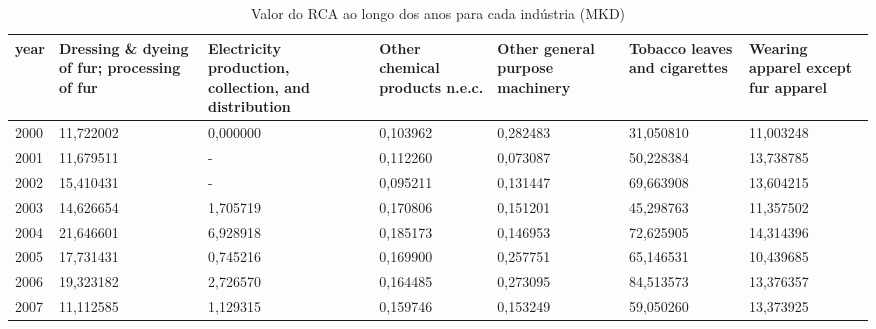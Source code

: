 \begin{table}
\centering
\caption{Valor do RCA ao longo dos anos para cada indústria (MKD)}
\begin{tabular}{p{1cm}p{2cm}p{2cm}p{2cm}p{2cm}p{2cm}p{2cm}}
\toprule
 year &  Dressing \& dyeing of fur; processing of fur &  Electricity production, collection, and distribution &  Other chemical products n.e.c. &  Other general purpose machinery &  Tobacco leaves and cigarettes &  Wearing apparel except fur apparel \\
\midrule
 2000 &                                    11,722002 &                                           0,000000 &                        0,103962 &                         0,282483 &                      31,050810 &                           11,003248 \\
 2001 &                                    11,679511 &                                                  - &                        0,112260 &                         0,073087 &                      50,228384 &                           13,738785 \\
 2002 &                                    15,410431 &                                                  - &                        0,095211 &                         0,131447 &                      69,663908 &                           13,604215 \\
 2003 &                                    14,626654 &                                           1,705719 &                        0,170806 &                         0,151201 &                      45,298763 &                           11,357502 \\
 2004 &                                    21,646601 &                                           6,928918 &                        0,185173 &                         0,146953 &                      72,625905 &                           14,314396 \\
 2005 &                                    17,731431 &                                           0,745216 &                        0,169900 &                         0,257751 &                      65,146531 &                           10,439685 \\
 2006 &                                    19,323182 &                                           2,726570 &                        0,164485 &                         0,273095 &                      84,513573 &                           13,376357 \\
 2007 &                                    11,112585 &                                           1,129315 &                        0,159746 &                         0,153249 &                      59,050260 &                           13,373925 \\

\end{tabular}
\end{table}
